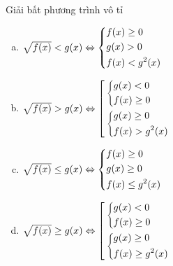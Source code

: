 \begin{dang}{Giải bất phương trình vô tỉ}
	\begin{multicols}{2}
		\begin{enumerate}[a)]
			\item $\sqrt{f(x)}<g(x)\Leftrightarrow\left\{\begin{aligned}&f(x)\geq0\\
				&g(x)>0\\
				&f(x)< g^2(x)\end{aligned}\right.$
			
			\item $\sqrt{f(x)}>g(x)\Leftrightarrow \left[\begin{aligned}&\left\{\begin{aligned}&g(x)<0\\&f(x)\geq0\\\end{aligned}\right.\\
				&\left\{\begin{aligned}&g(x)\geq0\\&f(x)>g^2(x)\end{aligned}\right.\end{aligned}\right.$
			\item $\sqrt{f(x)}\leq g(x)\Leftrightarrow\left\{\begin{aligned}&f(x)\geq0\\
				&g(x)\geq0\\
				&f(x)\leq g^2(x)\end{aligned}\right.$
			\item $\sqrt{f(x)}\geq g(x)\Leftrightarrow \left[\begin{aligned}&\left\{\begin{aligned}&g(x)<0\\&f(x)\geq0\\\end{aligned}\right.\\
				&\left\{\begin{aligned}&g(x)\geq0\\&f(x)\geq g^2(x)\end{aligned}\right.\end{aligned}\right.$
		\end{enumerate}
	\end{multicols}
	
\end{dang}

